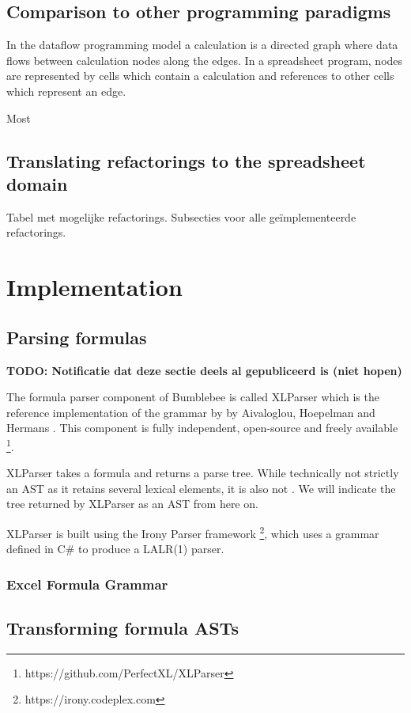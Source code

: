\documentclass[12pt,a4paper,onecolumn,oneside]{memoir}
\newcommand{\todo}[1]{\textbf{TODO: #1}}
\begin{document}
\section{Comparison to other programming paradigms}

In the dataflow programming model a calculation is a directed graph where data flows between calculation nodes along the edges.
In a spreadsheet program, nodes are represented by cells which contain a calculation and references to other cells which represent an edge.

Most 

\section{Translating refactorings to the spreadsheet domain}

Tabel met mogelijke refactorings.
Subsecties voor alle geïmplementeerde refactorings.

\chapter{Implementation}

\section{Parsing formulas}

\todo{Notificatie dat deze sectie deels al gepubliceerd is (niet hopen)}

The formula parser component of Bumblebee is called XLParser which is the reference implementation of the grammar by by Aivaloglou, Hoepelman and Hermans \cite{xlparser}.
This component is fully independent, open-source and freely available \footnote{https://github.com/PerfectXL/XLParser}.

XLParser takes a formula and returns a parse tree.
While technically not strictly an AST as it retains several lexical elements, it is also not .
We will indicate the tree returned by XLParser as an AST from here on.

XLParser is built using the Irony Parser framework \footnote{https://irony.codeplex.com}, which uses a grammar defined in C\# to produce a LALR(1) parser.

\subsection{Excel Formula Grammar}

\section{Transforming formula ASTs}
\end{document}
